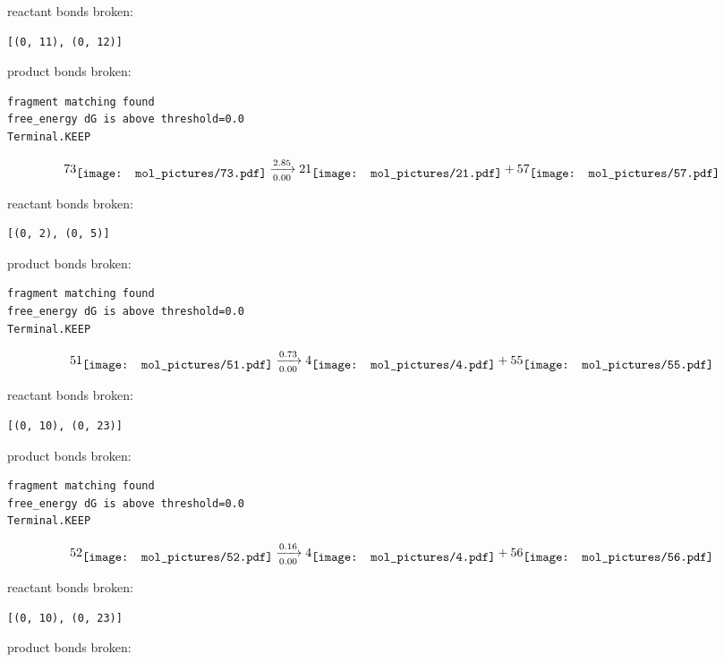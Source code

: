 \documentclass{article}
\begin{document}
reactant bonds broken:\begin{verbatim}
[(0, 11), (0, 12)]
\end{verbatim}
product bonds broken:



\vspace{1cm}
\begin{verbatim}
fragment matching found
free_energy dG is above threshold=0.0
Terminal.KEEP
\end{verbatim}
$$
73
\raisebox{-.5\height}{\texttt{[image: mol\_pictures/73.pdf]}}
\xrightarrow[0.00]{2.85}
21
\raisebox{-.5\height}{\texttt{[image: mol\_pictures/21.pdf]}}
+
57
\raisebox{-.5\height}{\texttt{[image: mol\_pictures/57.pdf]}}
$$


reactant bonds broken:\begin{verbatim}
[(0, 2), (0, 5)]
\end{verbatim}
product bonds broken:



\vspace{1cm}
\begin{verbatim}
fragment matching found
free_energy dG is above threshold=0.0
Terminal.KEEP
\end{verbatim}
$$
51
\raisebox{-.5\height}{\texttt{[image: mol\_pictures/51.pdf]}}
\xrightarrow[0.00]{0.73}
4
\raisebox{-.5\height}{\texttt{[image: mol\_pictures/4.pdf]}}
+
55
\raisebox{-.5\height}{\texttt{[image: mol\_pictures/55.pdf]}}
$$


reactant bonds broken:\begin{verbatim}
[(0, 10), (0, 23)]
\end{verbatim}
product bonds broken:



\vspace{1cm}
\begin{verbatim}
fragment matching found
free_energy dG is above threshold=0.0
Terminal.KEEP
\end{verbatim}
$$
52
\raisebox{-.5\height}{\texttt{[image: mol\_pictures/52.pdf]}}
\xrightarrow[0.00]{0.16}
4
\raisebox{-.5\height}{\texttt{[image: mol\_pictures/4.pdf]}}
+
56
\raisebox{-.5\height}{\texttt{[image: mol\_pictures/56.pdf]}}
$$


reactant bonds broken:\begin{verbatim}
[(0, 10), (0, 23)]
\end{verbatim}
product bonds broken:
\end{document}
